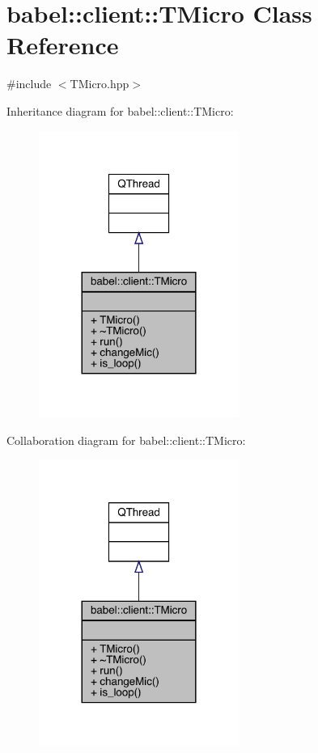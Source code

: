 \hypertarget{classbabel_1_1client_1_1_t_micro}{}\section{babel\+:\+:client\+:\+:T\+Micro Class Reference}
\label{classbabel_1_1client_1_1_t_micro}


{\ttfamily \#include $<$T\+Micro.\+hpp$>$}



Inheritance diagram for babel\+:\+:client\+:\+:T\+Micro\+:\nopagebreak
\begin{figure}[H]
\begin{center}
\leavevmode
\includegraphics[width=185pt]{classbabel_1_1client_1_1_t_micro__inherit__graph}
\end{center}
\end{figure}


Collaboration diagram for babel\+:\+:client\+:\+:T\+Micro\+:\nopagebreak
\begin{figure}[H]
\begin{center}
\leavevmode
\includegraphics[width=185pt]{classbabel_1_1client_1_1_t_micro__coll__graph}
\end{center}
\end{figure}
